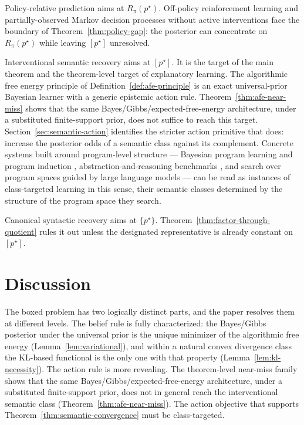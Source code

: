 \documentclass[11pt]{article}
\theoremstyle{definition}
\theoremstyle{remark}
\begin{document}
Policy-relative prediction aims at $R_\pi(p^\star)$. Off-policy reinforcement learning and partially-observed Markov decision processes without active interventions face the boundary of Theorem~\ref{thm:policy-gap}: the posterior can concentrate on $R_\pi(p^\star)$ while leaving $[p^\star]$ unresolved.

Interventional semantic recovery aims at $[p^\star]$. It is the target of the main theorem and the theorem-level target of explanatory learning. The algorithmic free energy principle of Definition~\ref{def:afe-principle} is an exact universal-prior Bayesian learner with a generic epistemic action rule. Theorem~\ref{thm:afe-near-miss} shows that the same Bayes/Gibbs/expected-free-energy architecture, under a substituted finite-support prior, does not suffice to reach this target. Section~\ref{sec:semantic-action} identifies the stricter action primitive that does: increase the posterior odds of a semantic class against its complement. Concrete systems built around program-level structure --- Bayesian program learning and program induction \citep{LakeEtAl2015,EllisEtAl2021DreamCoder}, abstraction-and-reasoning benchmarks \citep{Chollet2024ARC}, and search over program spaces guided by large language models \citep{RomeraParedesEtAl2024FunSearch} --- can be read as instances of class-targeted learning in this sense, their semantic classes determined by the structure of the program space they search.

Canonical syntactic recovery aims at $\{p^\star\}$. Theorem~\ref{thm:factor-through-quotient} rules it out unless the designated representative is already constant on $[p^\star]$.

\section{Discussion}
\label{sec:discussion}

The boxed problem has two logically distinct parts, and the paper resolves them at different levels. The belief rule is fully characterized: the Bayes/Gibbs posterior under the universal prior is the unique minimizer of the algorithmic free energy (Lemma~\ref{lem:variational}), and within a natural convex divergence class the KL-based functional is the only one with that property (Lemma~\ref{lem:kl-necessity}). The action rule is more revealing. The theorem-level near-miss family shows that the same Bayes/Gibbs/expected-free-energy architecture, under a substituted finite-support prior, does not in general reach the interventional semantic class (Theorem~\ref{thm:afe-near-miss}). The action objective that supports Theorem~\ref{thm:semantic-convergence} must be class-targeted.
\end{document}
